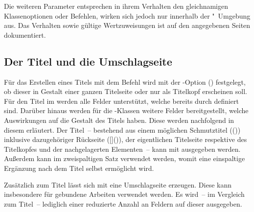 \begin{DeclareEntity*}{}
\begin{DeclareEntity*}{}
\begin{DeclareEntity*}{}
\begin{Declaration}
\begin{Declaration}
\begin{Declaration}
\begin{Declaration}
\begin{Declaration}
\begin{Declaration}
\begin{Declaration}
\begin{Declaration}
\begin{Declaration}
\begin{Declaration}
\begin{Declaration}
\begin{Declaration}
Die weiteren Parameter entsprechen in ihrem Verhalten den gleichnamigen 
Klassenoptionen oder Befehlen, wirken sich jedoch nur innerhalb der 
"~Umgebung aus. Das Verhalten sowie gültige 
Wertzuweisungen ist auf den angegebenen Seiten dokumentiert.
\end{Declaration}
\end{Declaration}
\end{Declaration}
\end{Declaration}
\end{Declaration}
\end{Declaration}
\end{Declaration}
\end{Declaration}
\end{Declaration}
\end{Declaration}
\end{Declaration}
\end{Declaration}
%



\subsection{%
  Der Titel und die Umschlagseite%
  \label{sec:title}%
}

%
Für das Erstellen eines Titels mit dem Befehl  wird mit der 
\KOMAScript-Option () festgelegt, ob 
dieser in Gestalt einer ganzen Titelseite oder nur als Titelkopf erscheinen 
soll. Für den Titel im \TUDCD werden alle Felder unterstützt, welche bereits 
durch \KOMAScript{} definiert sind. Darüber hinaus werden für die 
\TUDScript-Klassen weitere Felder bereitgestellt, welche Auswirkungen auf die 
Gestalt des Titels haben. Diese werden nachfolgend in diesem \autorefname 
erläutert. Der Titel~-- bestehend aus einem möglichen Schmutztitel 
(()) inklusive dazugehöriger Rückseite 
([]()), der 
eigentlichen Titelseite respektive des Titelkopfes und der nachgelagerten 
Elementen~-- kann mit  ausgegeben werden. Außerdem kann im 
zweispaltigen Satz  verwendet werden, womit eine 
einspaltige Ergänzung nach dem Titel selbst ermöglicht wird.

Zusätzlich zum Titel lässt sich mit  eine Umschlagseite 
erzeugen. Diese kann insbesondere für gebundene Arbeiten verwendet werden. Es 
wird~-- im Vergleich zum Titel~-- lediglich einer reduzierte Anzahl an Feldern 
auf dieser ausgegeben.


\end{DeclareEntity*}
\end{DeclareEntity*}
\end{DeclareEntity*}
